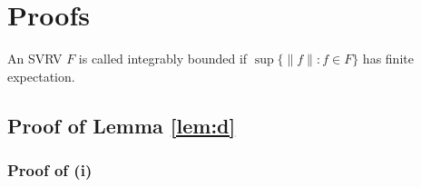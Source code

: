 \documentclass[11pt,reqno]{amsart}
\begin{document}




\newpage
\appendix

\section{Proofs}

An SVRV $F$ is called integrably bounded if $\sup\{\|f\|: f\in F\}$ has finite expectation.

\subsection{Proof of Lemma \ref{lem:d}}

\subsubsection{Proof of (i)} 
\end{document}
